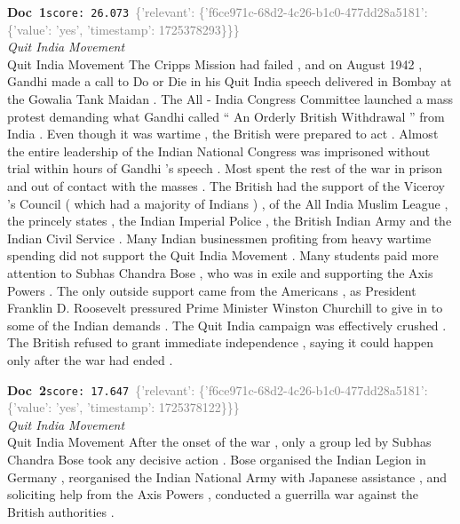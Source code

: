 \documentclass[a4paper,11pt]{article}
\begin{document}
\begin{docenv}
{\footnotesize\textcolor{doccolor}{\textbf{Doc~1}}}\hfill{\tiny\texttt{score:~26.073}}\ {\tiny\textcolor{gray}{\{'relevant': \{'f6ce971c-68d2-4c26-b1c0-477dd28a5181': \{'value': 'yes', 'timestamp': 1725378293\}\}\}}}\\[3pt]
{\small\textit{Quit India Movement}}\\[2pt]
\vspace{2pt}
{\footnotesize Quit India Movement
The Cripps Mission had failed , and on August 1942 , Gandhi made a call to Do or Die in his Quit India speech delivered in Bombay at the Gowalia Tank Maidan . The All - India Congress Committee launched a mass protest demanding what Gandhi called `` An Orderly British Withdrawal '' from India . Even though it was wartime , the British were prepared to act . Almost the entire leadership of the Indian National Congress was imprisoned without trial within hours of Gandhi 's speech . Most spent the rest of the war in prison and out of contact with the masses . The British had the support of the Viceroy 's Council ( which had a majority of Indians ) , of the All India Muslim League , the princely states , the Indian Imperial Police , the British Indian Army and the Indian Civil Service . Many Indian businessmen profiting from heavy wartime spending did not support the Quit India Movement . Many students paid more attention to Subhas Chandra Bose , who was in exile and supporting the Axis Powers . The only outside support came from the Americans , as President Franklin D. Roosevelt pressured Prime Minister Winston Churchill to give in to some of the Indian demands . The Quit India campaign was effectively crushed . The British refused to grant immediate independence , saying it could happen only after the war had ended .}
\end{docenv}
\begin{docenv}
{\footnotesize\textcolor{doccolor}{\textbf{Doc~2}}}\hfill{\tiny\texttt{score:~17.647}}\ {\tiny\textcolor{gray}{\{'relevant': \{'f6ce971c-68d2-4c26-b1c0-477dd28a5181': \{'value': 'yes', 'timestamp': 1725378122\}\}\}}}\\[3pt]
{\small\textit{Quit India Movement}}\\[2pt]
\vspace{2pt}
{\footnotesize Quit India Movement
After the onset of the war , only a group led by Subhas Chandra Bose took any decisive action . Bose organised the Indian Legion in Germany , reorganised the Indian National Army with Japanese assistance , and soliciting help from the Axis Powers , conducted a guerrilla war against the British authorities .}
\end{docenv}
\end{document}
